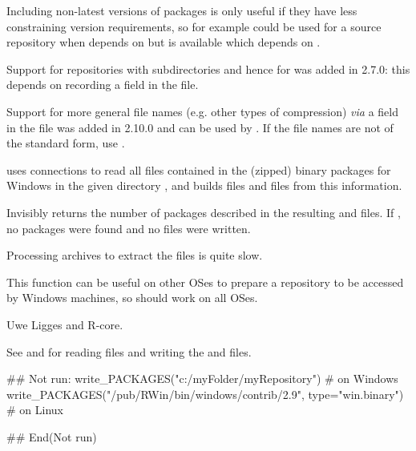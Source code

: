 \begin{Details}\relax
Including non-latest versions of packages is only useful if they have
less constraining version requirements, so for example
 could be used for a source repository when
 depends on  but  is
available which depends on .

Support for repositories with subdirectories and hence for
 was added in \R{} 2.7.0: this depends on
recording a  field in the  file.

Support for more general file names (e.g. other types of compression)
\emph{via} a  field in the  file was added
in \R{} 2.10.0 and can be used by .  If
the file names are not of the standard form, use
.

 uses  connections to read
all  files contained in the (zipped) binary packages
for Windows in the given directory , and builds files
 and  files from this information.
\end{Details}
%
\begin{Value}
Invisibly returns the number of packages described in the resulting
 and  files.  If , no packages were
found and no files were written.
\end{Value}
%
\begin{Note}\relax
Processing  archives to extract the 
files is quite slow.

This function can be useful on other OSes to prepare a repository to
be accessed by Windows machines, so  should
work on all OSes.
\end{Note}
%
\begin{Author}\relax
Uwe Ligges and R-core.
\end{Author}
%
\begin{SeeAlso}\relax
See  and  for reading
 files and writing the  and
 files.
\end{SeeAlso}
%
\begin{Examples}
\begin{ExampleCode}
## Not run: 
write_PACKAGES("c:/myFolder/myRepository")  # on Windows
write_PACKAGES("/pub/RWin/bin/windows/contrib/2.9",
               type="win.binary")  # on Linux

## End(Not run)
\end{ExampleCode}
\end{Examples}
